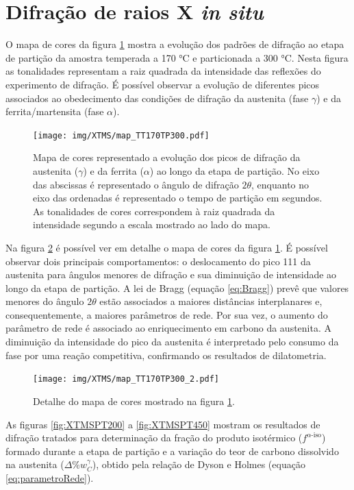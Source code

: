 \section{Difra\c{c}\~{a}o de raios X \textit{in situ}}

\label{sec:DRXInSitu}

O mapa de cores da figura \ref{fig:colorMap} mostra a evolução dos padrões de difração ao etapa de partição da amostra temperada a 170 °C e particionada a 300 °C. Nesta figura as tonalidades representam a raiz quadrada da intensidade das reflexões do experimento de difração. É possível observar a evolução de diferentes picos associados ao obedecimento das condições de difração da austenita (fase $\gamma$) e da ferrita/martensita (fase $\alpha$).

\begin{figure}
	\texttt{[image: img/XTMS/map\_TT170TP300.pdf]}
	\caption{Mapa de cores representado a evolução dos picos de difração da austenita ($\gamma$) e da ferrita ($\alpha$) ao longo da etapa de partição. No eixo das abscissas é representado o ângulo de difração $2\theta$, enquanto no eixo das ordenadas é representado o tempo de partição em segundos. As tonalidades de cores correspondem à raiz quadrada da intensidade segundo a escala mostrado ao lado do mapa.}
	\label{fig:colorMap}
\end{figure}

Na figura \ref{fig:colorMap2} é possível ver em detalhe o mapa de cores da figura \ref{fig:colorMap}. É possível observar dois principais comportamentos: o deslocamento do pico {111} da austenita para ângulos menores de difração e sua diminuição de intensidade ao longo da etapa de partição. A lei de Bragg (equação \ref{eq:Bragg}) prevê que valores menores do ângulo $2\theta$ estão associados a maiores distâncias interplanares e, consequentemente, a maiores parâmetros de rede. Por sua vez, o aumento do parâmetro de rede é associado ao enriquecimento em carbono da austenita. A diminuição da intensidade do pico da austenita é interpretado pelo consumo da fase por uma reação competitiva, confirmando os resultados de dilatometria.

\begin{figure}
	\texttt{[image: img/XTMS/map\_TT170TP300\_2.pdf]}
	\caption{Detalhe do mapa de cores mostrado na figura \ref{fig:colorMap}.}
	\label{fig:colorMap2}
\end{figure}

As figuras \ref{fig:XTMSPT200} a \ref{fig:XTMSPT450} mostram os resultados de difração tratados para determinação da fração do produto isotérmico ($f^{\alpha\text{-iso}}$) formado durante a etapa de partição e a variação do teor de carbono dissolvido na austenita ($\Delta\%w_C^\gamma$), obtido pela relação de Dyson e Holmes (equação \ref{eq:parametroRede}).

